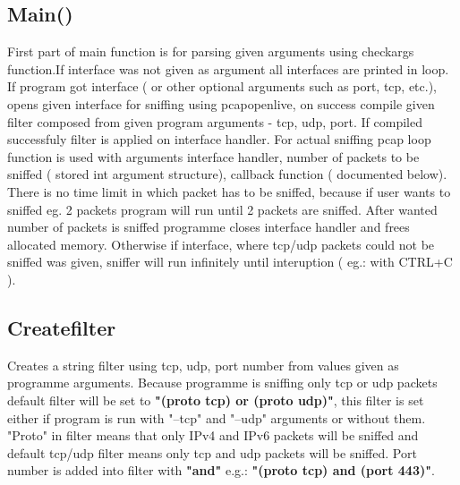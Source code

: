 \documentclass{article}
\begin{document}
\subsection{Main()}
First part of main function is for parsing given arguments using check\textunderscore args function.If interface was not given as argument all interfaces are printed in loop.\newline
	If program got interface ( or other optional arguments such as port, tcp, etc.), 
	opens given interface for sniffing using pcap\textunderscore open\textunderscore live, on success compile given filter composed from given program arguments - tcp, udp, port. If compiled successfuly filter is applied on interface handler.\newline
	For actual sniffing pcap \textunderscore loop function is used with arguments interface handler, number of packets to be sniffed ( stored int argument structure), callback function ( documented below). There is no time limit in which packet has to be sniffed, because if user wants to sniffed eg. 2 packets program will run until 2 packets are sniffed.  After wanted number of packets is sniffed programme closes interface handler and frees allocated memory.\newline
	 Otherwise if interface, where tcp/udp packets could not be sniffed was given, sniffer will run infinitely until interuption ( eg.: with CTRL+C ).\newline
	
\subsection{Create\textunderscore filter}
Creates a string filter using tcp, udp, port number from values given as programme arguments. Because programme is sniffing only tcp or udp packets default filter will be set to \textbf{"(proto tcp) or (proto udp)"}, this filter is set either if program is run with "--tcp" and "--udp" arguments or without them. "Proto" in filter means that only IPv4 and IPv6 packets will be sniffed and default tcp/udp filter means only tcp and udp packets will be sniffed. Port number is added into filter with \textbf{"and"} e.g.: \textbf{"(proto tcp) and (port 443)"}.
\end{document}
